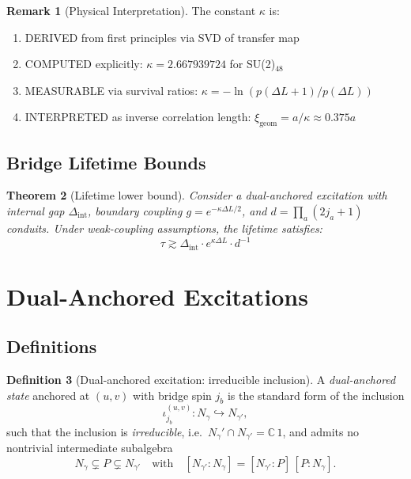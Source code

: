 \documentclass[11pt]{article}
\newcommand{\Index}[2]{\left[#1:#2\right]}
\theoremstyle{plain}
\newtheorem{theorem}{Theorem}[section]
\theoremstyle{definition}
\newtheorem{definition}[theorem]{Definition}
\newtheorem{remark}[theorem]{Remark}
\begin{document}
\begin{remark}[Physical Interpretation]
  The constant $\kappa$ is:
  \begin{enumerate}
    \item DERIVED from first principles via SVD of transfer map
    \item COMPUTED explicitly: $\kappa = 2.667939724$ for SU(2)$_{48}$
    \item MEASURABLE via survival ratios: $\kappa = -\ln(p(\Delta L+1)/p(\Delta L))$
    \item INTERPRETED as inverse correlation length: $\xi_{\text{geom}} = a/\kappa \approx 0.375a$
  \end{enumerate}
\end{remark}

\subsection{Bridge Lifetime Bounds}

\begin{theorem}[Lifetime lower bound]\label{thm:lifetime-derived}
  Consider a dual-anchored excitation with internal gap $\Delta_{\mathrm{int}}$, boundary coupling $g = e^{-\kappa \Delta L/2}$, and $d = \prod_a(2j_a+1)$ conduits. Under weak-coupling assumptions, the lifetime satisfies:
  \begin{equation}
    \tau \gtrsim \Delta_{\mathrm{int}} \cdot e^{\kappa \Delta L} \cdot d^{-1}
  \end{equation}
\end{theorem}

\section{Dual-Anchored Excitations}
\label{sec:dual-anchored}

\subsection{Definitions}

\begin{definition}[Dual-anchored excitation: irreducible inclusion]\label{def:dual-anchored-irreducible}
  A \emph{dual-anchored state} anchored at $(u,v)$ with bridge spin $j_b$ is the standard form of the inclusion
  \[
    \iota^{(u,v)}_{j_b}: N_\gamma \hookrightarrow N_{\gamma'} ,
  \]
  such that the inclusion is \emph{irreducible}, i.e.\ $N_\gamma' \cap N_{\gamma'} = \mathbb{C}\,1$, and admits no nontrivial intermediate subalgebra
  \[
    N_\gamma \subsetneq P \subsetneq N_{\gamma'} \quad\text{with}\quad \Index{N_{\gamma'}}{N_\gamma} = \Index{N_{\gamma'}}{P}\,\Index{P}{N_\gamma}.
  \]
\end{definition}
\end{document}
